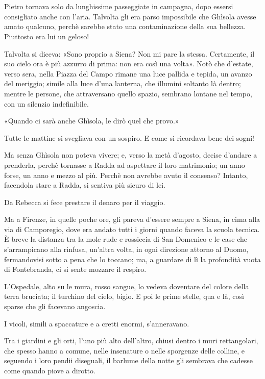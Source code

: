 \chapter{}

Pietro tornava solo da lunghissime passeggiate in campagna, dopo essersi consigliato anche con l'aria. Talvolta gli era parso impossibile che Ghìsola avesse amato qualcuno, perchè sarebbe stato una contaminazione della sua bellezza. Piuttosto era lui un geloso!

Talvolta si diceva: «Sono proprio a Siena? Non mi pare la stessa. Certamente, il suo cielo ora è più azzurro di prima: non era così una volta». Notò che d'estate, verso sera, nella Piazza del Campo rimane una luce pallida e tepida, un avanzo del meriggio; simile alla luce d'una lanterna, che illumini soltanto là dentro; mentre le persone, che attraversano quello spazio, sembrano lontane nel tempo, con un silenzio indefinibile.

«Quando ci sarà anche Ghìsola, le dirò quel che provo.»

Tutte le mattine si svegliava con un sospiro. E come si ricordava bene dei sogni!

Ma senza Ghìsola non poteva vivere; e, verso la metà d'agosto, decise d'andare a prenderla, perchè tornasse a Radda ad aspettare il loro matrimonio; un anno forse, un anno e mezzo al più. Perchè non avrebbe avuto il consenso? Intanto, facendola stare a Radda, si sentiva più sicuro di lei.

Da Rebecca si fece prestare il denaro per il viaggio.

Ma a Firenze, in quelle poche ore, gli pareva d'essere sempre a Siena, in cima alla via di Camporegio, dove era andato tutti i giorni quando faceva la scuola tecnica. È breve la distanza tra la mole rude e rossiccia di San Domenico e le case che s'arrampicano alla rinfusa, un'altra volta, in ogni direzione attorno al Duomo, fermandovisi sotto a pena che lo toccano; ma, a guardare di lì la profondità vuota di Fontebranda, ci si sente mozzare il respiro.

L'Ospedale, alto su le mura, rosso sangue, lo vedeva doventare del colore della terra bruciata; il turchino del cielo, bigio. E poi le prime stelle, qua e là, così sparse che gli facevano angoscia.

I vicoli, simili a spaccature e a cretti enormi, s'anneravano.

Tra i giardini e gli orti, l'uno più alto dell'altro, chiusi dentro i muri rettangolari, che spesso hanno a comune, nelle insenature o nelle sporgenze delle colline, e seguendo i loro pendii diseguali, il barlume della notte gli sembrava che cadesse come quando piove a dirotto.

